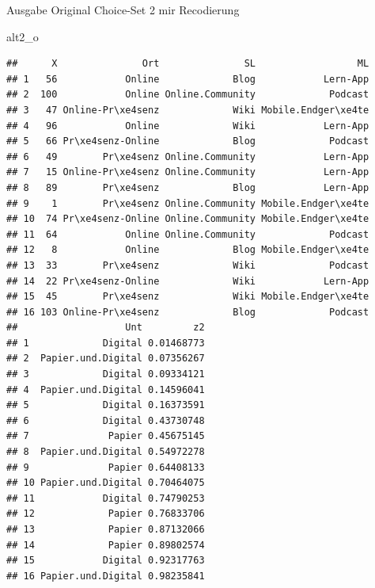 \documentclass[12pt,ngerman,a4paper,ignorenonframetext,]{beamer}
\newenvironment{Shaded}{\begin{snugshade}}{\end{snugshade}}
\newcommand{\NormalTok}[1]{#1}
\begin{document}
\begin{frame}{Ausgabe Original Choice-Set 2 mir
Recodierung}
\protect\hypertarget{ausgabe-original-choice-set-2-mir-recodierung}{}

\begin{Shaded}
\begin{Highlighting}[]
\NormalTok{alt2_o}
\end{Highlighting}
\end{Shaded}

\begin{verbatim}
##      X               Ort               SL                  ML
## 1   56            Online             Blog            Lern-App
## 2  100            Online Online.Community             Podcast
## 3   47 Online-Pr\xe4senz             Wiki Mobile.Endger\xe4te
## 4   96            Online             Wiki            Lern-App
## 5   66 Pr\xe4senz-Online             Blog             Podcast
## 6   49        Pr\xe4senz Online.Community            Lern-App
## 7   15 Online-Pr\xe4senz Online.Community            Lern-App
## 8   89        Pr\xe4senz             Blog            Lern-App
## 9    1        Pr\xe4senz Online.Community Mobile.Endger\xe4te
## 10  74 Pr\xe4senz-Online Online.Community Mobile.Endger\xe4te
## 11  64            Online Online.Community             Podcast
## 12   8            Online             Blog Mobile.Endger\xe4te
## 13  33        Pr\xe4senz             Wiki             Podcast
## 14  22 Pr\xe4senz-Online             Wiki            Lern-App
## 15  45        Pr\xe4senz             Wiki Mobile.Endger\xe4te
## 16 103 Online-Pr\xe4senz             Blog             Podcast
##                   Unt         z2
## 1             Digital 0.01468773
## 2  Papier.und.Digital 0.07356267
## 3             Digital 0.09334121
## 4  Papier.und.Digital 0.14596041
## 5             Digital 0.16373591
## 6             Digital 0.43730748
## 7              Papier 0.45675145
## 8  Papier.und.Digital 0.54972278
## 9              Papier 0.64408133
## 10 Papier.und.Digital 0.70464075
## 11            Digital 0.74790253
## 12             Papier 0.76833706
## 13             Papier 0.87132066
## 14             Papier 0.89802574
## 15            Digital 0.92317763
## 16 Papier.und.Digital 0.98235841
\end{verbatim}

\end{frame}
\end{document}
